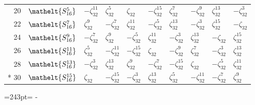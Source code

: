 \documentclass[10pt,a4paper]{article}
\newcommand{\needspace}[1]{\par\penalty-100\begingroup\dimen0=#1\relax\dimen2=\pagegoal
  \advance\dimen2-\pagetotal\ifdim\dimen0>\dimen2\relax\ifdim\dimen2>0pt\vfil\break\fi\fi
  \endgroup}
\numberwithin{equation}{section}
\newcommand{\eltfont}[1]{{\let\sigma\eltsigma\mathelt{#1}}}
\newcommand{\cls}[1]{\eltfont{#1}}
\newcommand{\rootunity}[1]{\zeta_{#1}}
\begin{document}
{\begin{longtable}{@{}rlllllllll@{}}
20 & $\cls{S_{16}^{5}}$ & $-\rootunity{32}^{11}$ & $\rootunity{32}^{5}$ & $\rootunity{32}$ & $-\rootunity{32}^{15}$ & $\rootunity{32}^{7}$ & $-\rootunity{32}^{9}$ & $\rootunity{32}^{13}$ & $-\rootunity{32}^{3}$\\
22 & $\cls{S_{16}^{7}}$ & $\rootunity{32}^{9}$ & $-\rootunity{32}^{7}$ & $\rootunity{32}^{11}$ & $-\rootunity{32}^{5}$ & $\rootunity{32}^{13}$ & $-\rootunity{32}^{3}$ & $\rootunity{32}^{15}$ & $-\rootunity{32}$\\
24 & $\cls{S_{16}^{9}}$ & $-\rootunity{32}^{7}$ & $\rootunity{32}^{9}$ & $-\rootunity{32}^{5}$ & $\rootunity{32}^{11}$ & $-\rootunity{32}^{3}$ & $\rootunity{32}^{13}$ & $-\rootunity{32}$ & $\rootunity{32}^{15}$\\
26 & $\cls{S_{16}^{11}}$ & $\rootunity{32}^{5}$ & $-\rootunity{32}^{11}$ & $-\rootunity{32}^{15}$ & $\rootunity{32}$ & $-\rootunity{32}^{9}$ & $\rootunity{32}^{7}$ & $-\rootunity{32}^{3}$ & $\rootunity{32}^{13}$\\
28 & $\cls{S_{16}^{13}}$ & $-\rootunity{32}^{3}$ & $\rootunity{32}^{13}$ & $\rootunity{32}^{9}$ & $-\rootunity{32}^{7}$ & $-\rootunity{32}^{15}$ & $\rootunity{32}$ & $-\rootunity{32}^{5}$ & $\rootunity{32}^{11}$\\*
30 & $\cls{S_{16}^{15}}$ & $\rootunity{32}$ & $-\rootunity{32}^{15}$ & $-\rootunity{32}^{3}$ & $\rootunity{32}^{13}$ & $\rootunity{32}^{5}$ & $-\rootunity{32}^{11}$ & $-\rootunity{32}^{7}$ & $\rootunity{32}^{9}$\\
\bottomrule\end{longtable}}
\needspace{243pt}
\end{document}
